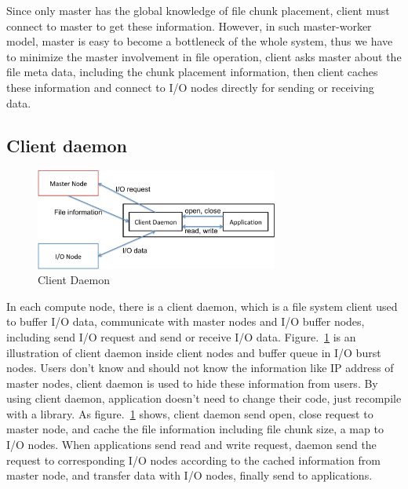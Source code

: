 Since only master has the global knowledge of file chunk placement, client must connect to master
to get these information.
However, in such master-worker model, master is easy to become a bottleneck of the whole system,
thus we have to minimize the master involvement in file operation, client asks master about the
file meta data, including the chunk placement information, then client caches these information and
connect to I/O nodes directly for sending or receiving data.

\subsection{Client daemon}

\begin{figure}[tb]
	\centering
	\includegraphics[width=8cm]{img/client_daemon}
	\caption{Client Daemon}
	\label{implementaion:client_daemon}
\end{figure}

In each compute node, there is a client daemon, which is a file system client used to buffer I/O
data, communicate with master nodes and I/O buffer nodes, including send I/O request and send or
receive I/O data.
Figure.~\ref{implementaion:client_daemon} is an illustration of client daemon inside client nodes
and buffer queue in I/O burst nodes.
Users don't know and should not know the information like IP address of master nodes,  client daemon
is used to hide these information from users.
By using client daemon, application doesn't need to change their code, just recompile with a
library.
As figure.~\ref{implementaion:client_daemon} shows, client daemon send open, close request to master node, and cache the file information including file chunk size, a map to I/O nodes.
When applications send read and write request, daemon send the request to corresponding I/O nodes
according to the cached information from master node, and transfer data with I/O nodes, finally
send to applications.


